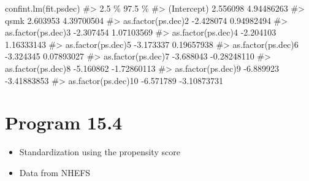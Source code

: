 \documentclass[
  10pt,
  a4paper,
]{book}
\newenvironment{Shaded}{\begin{snugshade}}{\end{snugshade}}
\newcommand{\CommentTok}[1]{\textcolor[rgb]{0.37,0.37,0.37}{#1}}
\newcommand{\FunctionTok}[1]{\textcolor[rgb]{0.28,0.35,0.67}{#1}}
\newcommand{\NormalTok}[1]{\textcolor[rgb]{0.00,0.46,0.62}{#1}}
\providecommand{\tightlist}{%
  \setlength{\itemsep}{0pt}\setlength{\parskip}{0pt}}
\begin{document}
\begin{Shaded}
\begin{Highlighting}[]
\FunctionTok{confint.lm}\NormalTok{(fit.psdec)}
\CommentTok{\#\textgreater{}                         2.5 \%      97.5 \%}
\CommentTok{\#\textgreater{} (Intercept)          2.556098  4.94486263}
\CommentTok{\#\textgreater{} qsmk                 2.603953  4.39700504}
\CommentTok{\#\textgreater{} as.factor(ps.dec)2  {-}2.428074  0.94982494}
\CommentTok{\#\textgreater{} as.factor(ps.dec)3  {-}2.307454  1.07103569}
\CommentTok{\#\textgreater{} as.factor(ps.dec)4  {-}2.204103  1.16333143}
\CommentTok{\#\textgreater{} as.factor(ps.dec)5  {-}3.173337  0.19657938}
\CommentTok{\#\textgreater{} as.factor(ps.dec)6  {-}3.324345  0.07893027}
\CommentTok{\#\textgreater{} as.factor(ps.dec)7  {-}3.688043 {-}0.28248110}
\CommentTok{\#\textgreater{} as.factor(ps.dec)8  {-}5.160862 {-}1.72860113}
\CommentTok{\#\textgreater{} as.factor(ps.dec)9  {-}6.889923 {-}3.41883853}
\CommentTok{\#\textgreater{} as.factor(ps.dec)10 {-}6.571789 {-}3.10873731}
\end{Highlighting}
\end{Shaded}

\section{Program 15.4}\label{program-15.4}

\begin{itemize}
\tightlist
\item
  Standardization using the propensity score
\item
  Data from NHEFS
\end{itemize}
\end{document}
